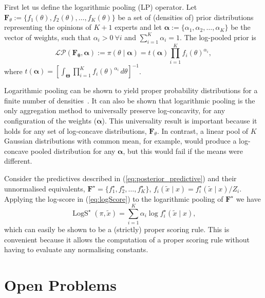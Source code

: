 \documentclass[a4paper, notitlepage, 11pt]{article}
\begin{document}
First let us define the logarithmic pooling (LP) operator.
Let $\mathbf{F}_{\theta} := \{f_1(\theta), f_2(\theta), \ldots, f_K(\theta)\}$ be a set of (densities of) prior distributions representing the opinions of $K+1$ experts and let $\boldsymbol\alpha :=\{\alpha_1, \alpha_2, \ldots, \alpha_K \}$ be the vector of weights, such that $\alpha_i > 0\: \forall i$ and $\sum_{i=1}^K \alpha_i = 1$.
The log-pooled prior is
\begin{equation}
\label{eq:logpool}
 \mathcal{LP}(\mathbf{F_\theta}, \boldsymbol\alpha) := \pi(\theta \mid \boldsymbol\alpha) = t(\boldsymbol\alpha) \prod_{i=1}^K f_i(\theta)^{\alpha_i},
\end{equation}
where $t(\boldsymbol\alpha) = \left[ \int_{\boldsymbol\Theta}\prod_{i=1}^K f_i(\theta)^{\alpha_i}\, d\theta \right]^{-1}$.

Logarithmic pooling can be shown to yield proper probability distributions for a finite number of densities~\citep[pg.489]{Genest1986A}.
It can also be shown that logarithmic pooling is the only aggregation method to universally preserve log-concavity, for any configuration of the weights ($\boldsymbol{\alpha}$).
This universality result is important because it holds for any set of log-concave distributions, $\mathbf{F}_{\theta}$.
In contrast, a linear pool of $K$ Gaussian distributions with common mean, for example, would produce a log-concave pooled distribution for any $\boldsymbol{\alpha}$, but this would fail if the means were different.

Consider the predictives described in (\ref{eq:posterior_predictive}) and their unnormalised equivalents, $\boldsymbol{F}^\star = \{f_1^\star, f_2^\star, \ldots, f_K^\star \}$, $f_i(\tilde{x} \mid x) = f_i^\star(\tilde{x} \mid x)/Z_i$.
Applying the log-score in (\ref{eq:logScore}) to the logarithmic pooling of $\boldsymbol{F}^\star$ we have
\begin{equation}
 \label{eq:log_score_pool}
  \operatorname{LogS}^\star(\pi, \tilde{x}) = \sum_{i=1}^K \alpha_i \log f_i^\star(\tilde{x} \mid x),
\end{equation}
which can easily be shown to be a (strictly) proper scoring rule.
This is convenient because it allows the computation of a proper scoring rule without having to evaluate any normalising constants.

\section*{Open Problems}
\end{document}

